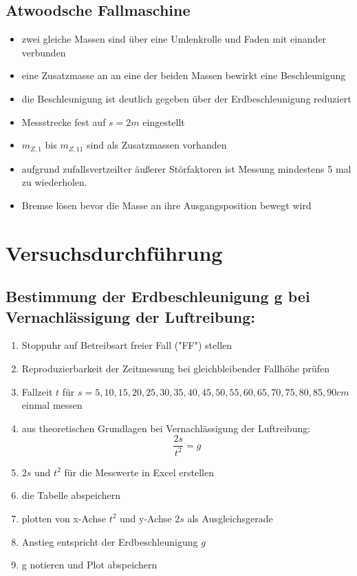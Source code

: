\documentclass{protokoll}
\begin{document}
\subsection{Atwoodsche Fallmaschine}
\begin{itemize}

\item zwei gleiche Massen sind über eine Umlenkrolle und Faden mit einander
verbunden
\item eine Zusatzmasse an an eine der beiden Massen bewirkt eine Beschleunigung
\item die Beschleunigung ist deutlich gegeben über der Erdbeschleunigung reduziert
\item Messstrecke fest auf $s = 2m $ eingestellt
\item $m_{Z,1}$ bis $m_{Z,11}$ sind als Zusatzmassen vorhanden
\item aufgrund zufallsvertzeilter äußerer Störfaktoren ist Messung 
mindestens 5 mal zu wiederholen.
\item Bremse lösen bevor die Masse an ihre Ausgangsposition bewegt wird

\end{itemize}


\section{Versuchsdurchführung}




\subsection{Bestimmung der Erdbeschleunigung g bei Vernachlässigung der Luftreibung:}
\begin{enumerate}

\item Stoppuhr auf Betreibsart freier Fall ("FF") stellen
\item Reproduzierbarkeit der Zeitmessung bei gleichbleibender Fallhöhe prüfen
\item Fallzeit $t$ für $ s = 5, 10, 15, 20, 25, 30, 35, 40, 45, 50, 55, 60, 
65, 70, 75, 80, 85, 90 cm $ einmal messen
\item aus theoretischen Grundlagen bei Vernachlässigung der Luftreibung:
\begin{equation}
 \frac{2s}{t^2} = g 
\end{equation}


\item $2s$ und $t^2$ für die Messwerte in Excel erstellen
\item die Tabelle abspeichern
\item plotten von x-Achse $t^2$ und y-Achse $2s$ als Ausgleichsgerade
\item Anstieg entspricht der Erdbeschleunigung $g$
\item g notieren und Plot abspeichern

\end{enumerate}
\end{document}
